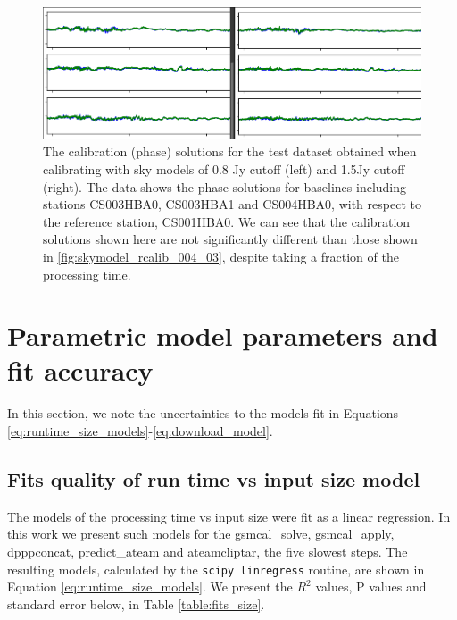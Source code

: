 \begin{figure}
    \includegraphics[width=0.95\linewidth]{figures/08_and_15_solutsions_CS003HBA0_CS003HBA1_CS004HBA0.png}
      \caption{The calibration (phase) solutions for the test dataset obtained when calibrating with sky models of 0.8 Jy cutoff (left) and 1.5Jy cutoff (right). The data shows the phase solutions for baselines including stations CS003HBA0, CS003HBA1 and CS004HBA0, with respect to the reference station, CS001HBA0. We can see that the calibration solutions shown here are not significantly different than those shown in \ref{fig:skymodel_rcalib_004_03}, despite taking a fraction of the processing time.  }
	\label{fig:skymodel_rcalib_08_15}
\end{figure}

\section{Parametric model parameters and fit accuracy}\label{ap:model_params}

In this section, we note the uncertainties to the models fit in Equations \ref{eq:runtime_size_models}-\ref{eq:download_model}. 

\setcounter{equation}{6}
\renewcommand{\theequation}{\Alph{section}.\arabic{equation}}

\subsection{Fits quality of run time vs input size model}

The models of the processing time vs input size were fit as a linear regression. In this work we present such models for the gsmcal\_solve, gsmcal\_apply, dpppconcat, predict\_ateam and ateamcliptar, the five slowest steps. The resulting models, calculated by the \texttt{scipy linregress}\citep{scipy} routine, are shown in Equation \ref{eq:runtime_size_models}. We present the $R^2$ values, P values and standard error below, in Table \ref{table:fits_size}.



